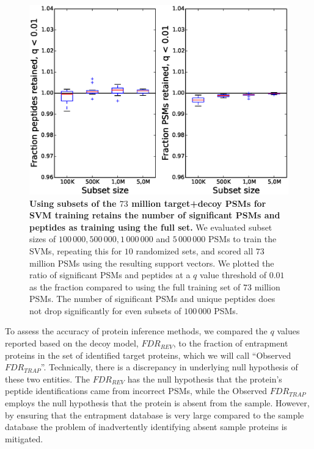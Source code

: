 \documentclass{article}
\begin{document}
\begin{figure}[!htp]
\begin{center}
\includegraphics[width=0.6\linewidth]{./img/subset-performance}
\caption{\label{fig:subset}\textbf{Using subsets of the $73$ million
target+decoy PSMs for SVM training retains the number of significant
PSMs and peptides as training using the full set.} We evaluated subset
sizes of $100\,000, 500\,000, 1\,000\,000$ and $5\,000\,000$ PSMs to
train the SVMs, repeating this for $10$ randomized sets, and scored
all $73$ million PSMs using the resulting support vectors. We plotted
the ratio of significant PSMs and peptides at a $q$ value threshold of
$0.01$ as the fraction compared to using the full training set of $73$
million PSMs. The number of significant PSMs and unique peptides does
not drop significantly for even subsets of $100\,000$ PSMs.}
\end{center}
\end{figure}

To assess the accuracy of protein inference methods, we compared the
$q$ values reported based on the decoy model, $FDR_{REV}$, to the
fraction of entrapment proteins in the set of identified target
proteins, which we will call ``Observed $FDR_{TRAP}$''. Technically,
there is a discrepancy in underlying null hypothesis of these two
entities. The $FDR_{REV}$ has the null hypothesis that the
protein's peptide identifications came from incorrect PSMs, while the
Observed $FDR_{TRAP}$ employs the null hypothesis that the protein is
absent from the sample. However, by ensuring that the entrapment
database is very large compared to the sample database the problem of
inadvertently identifying absent sample proteins is mitigated.
\end{document}
